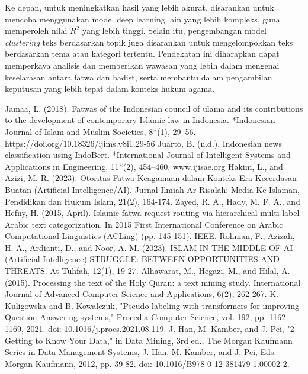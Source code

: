 \documentclass[12pt,a4paper]{article}
\begin{document}
Ke depan, untuk meningkatkan hasil yang lebih akurat, disarankan untuk mencoba menggunakan model deep learning lain yang lebih kompleks, guna memperoleh nilai $R^2$ yang lebih tinggi. Selain itu, pengembangan model \textit{clustering} teks berdasarkan topik juga disarankan untuk mengelompokkan teks berdasarkan tema atau kategori tertentu. Pendekatan ini diharapkan dapat memperkaya analisis dan memberikan wawasan yang lebih dalam mengenai keselarasan antara fatwa dan hadist, serta membantu dalam pengambilan keputusan yang lebih tepat dalam konteks hukum agama.


\newpage


\begin{thebibliography}{9}

 Jamaa, L. (2018). Fatwas of the Indonesian council of ulama and its contributions to the development of contemporary Islamic law in Indonesia. *Indonesian Journal of Islam and Muslim Societies, 8*(1), 29–56. https://doi.org/10.18326/ijims.v8i1.29-56
 Juarto, B. (n.d.). Indonesian news classification using IndoBert. *International Journal of Intelligent Systems and Applications in Engineering, 11*(2), 454–460. www.ijisae.org
 Hakim, L., and Azizi, M. R. (2023). Otoritas Fatwa Keagamaan dalam Konteks Era Kecerdasan Buatan (Artificial Intelligence/AI). Jurnal Ilmiah Ar-Risalah: Media Ke-Islaman, Pendidikan dan Hukum Islam, 21(2), 164-174.
 Zayed, R. A., Hady, M. F. A., and Hefny, H. (2015, April). Islamic fatwa request routing via hierarchical multi-label Arabic text categorization. In 2015 First International Conference on Arabic Computational Linguistics (ACLing) (pp. 145-151). IEEE.
 Rohman, F., Azizah, H. A., Ardianti, D., and Noor, A. M. (2023). ISLAM IN THE MIDDLE OF AI (Artificial Intelligence) STRUGGLE: BETWEEN OPPORTUNITIES AND THREATS. At-Tuhfah, 12(1), 19-27.
 Alhawarat, M., Hegazi, M., and Hilal, A. (2015). Processing the text of the Holy Quran: a text mining study. International Journal of Advanced Computer Science and Applications, 6(2), 262-267.
 K. Kuligowska and B. Kowalczuk, "Pseudo-labeling with transformers for improving Question Answering systems," Procedia Computer Science, vol. 192, pp. 1162-1169, 2021. doi: 10.1016/j.procs.2021.08.119.
 J. Han, M. Kamber, and J. Pei, "2 - Getting to Know Your Data," in Data Mining, 3rd ed., The Morgan Kaufmann Series in Data Management Systems, J. Han, M. Kamber, and J. Pei, Eds. Morgan Kaufmann, 2012, pp. 39-82. doi: 10.1016/B978-0-12-381479-1.00002-2.

\end{thebibliography}
\end{document}
